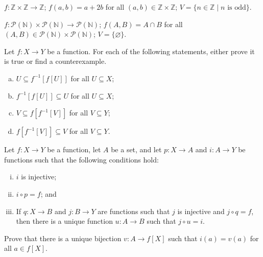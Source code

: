 \begin{chapex}
$f : \mathbb{Z} \times \mathbb{Z} \to \mathbb{Z}$; $f(a,b) = a+2b$ for all $(a,b) \in \mathbb{Z} \times \mathbb{Z}$; $V = \{ n \in \mathbb{Z} \mid n \text{ is odd} \}$.
\end{chapex}

\begin{chapex}
\label{cqComputePreimageEnd}
$f : \mathcal{P}(\mathbb{N}) \times \mathcal{P}(\mathbb{N}) \to \mathcal{P}(\mathbb{N})$; $f(A,B) = A \cap B$ for all $(A,B) \in \mathcal{P}(\mathbb{N}) \times \mathcal{P}(\mathbb{N})$; $V = \{ \varnothing \}$.
\end{chapex}

\begin{chapex}
Let $f : X \to Y$ be a function. For each of the following statements, either prove it is true or find a counterexample.
\begin{multicols}{2}
\begin{enumerate}[(a)]
\item $U \subseteq f^{-1}[f[U]]$ for all $U \subseteq X$;
\item $f^{-1}[f[U]] \subseteq U$ for all $U \subseteq X$;
\item $V \subseteq f[f^{-1}[V]]$ for all $V \subseteq Y$;
\item $f[f^{-1}[V]] \subseteq V$ for all $V \subseteq Y$.
\end{enumerate}
\end{multicols}
\end{chapex}

\begin{chapex}
Let $f : X \to Y$ be a function, let $A$ be a set, and let $p : X \to A$ and $i : A \to Y$ be functions such that the following conditions hold:
\begin{enumerate}[(i)]
\item $i$ is injective;
\item $i \circ p = f$; and
\item If $q : X \to B$ and $j : B \to Y$ are functions such that $j$ is injective and $j \circ q = f$, then there is a unique function $u : A \to B$ such that $j \circ u = i$.
\end{enumerate}
Prove that there is a unique bijection $v : A \to f[X]$ such that $i(a)=v(a)$ for all $a \in f[X]$.
\end{chapex}

